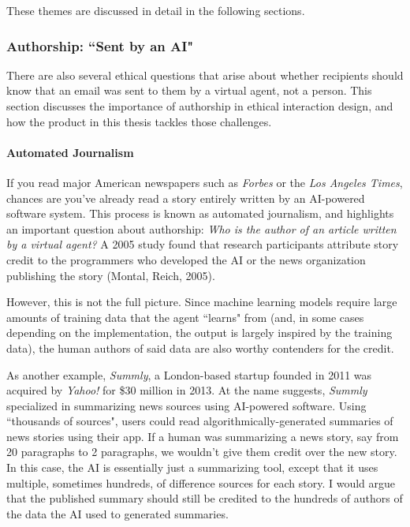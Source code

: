 \documentclass{article}
\begin{document}
These themes are discussed in detail in the following sections.

\subsubsection{Authorship: ``Sent by an AI"}

There are also several ethical questions that arise about whether recipients should know that an email was sent to them by a virtual agent, not a person. This section discusses the importance of authorship in ethical interaction design, and how the product in this thesis tackles those challenges.

\paragraph{Automated Journalism}


If you read major American newspapers such as \emph{Forbes} or the \emph{Los Angeles Times}, chances are you've already read a story entirely written by an AI-powered software system. This process is known as automated journalism, and highlights an important question about authorship: \emph{Who is the author of an article written by a virtual agent?} A 2005 study found that research participants attribute story credit to the programmers who developed the AI or the news organization publishing the story (Montal, Reich, 2005). 

However, this is not the full picture. Since machine learning models require large amounts of training data that the agent ``learns" from (and, in some cases depending on the implementation, the output is largely inspired by the training data), the human authors of said data are also worthy contenders for the credit.

As another example, \emph{Summly}, a London-based startup founded in 2011 was acquired by \emph{Yahoo!} for \$30 million in 2013. At the name suggests, \emph{Summly} specialized in summarizing news sources using AI-powered software. Using ``thousands of sources", users could read algorithmically-generated summaries of news stories using their app. If a human was summarizing a news story, say from 20 paragraphs to 2 paragraphs, we wouldn't give them credit over the new story. In this case, the AI is essentially just a summarizing tool, except that it uses multiple, sometimes hundreds, of difference sources for each story. I would argue that the published summary should still be credited to the hundreds of authors of the data the AI used to generated summaries.
\end{document}
